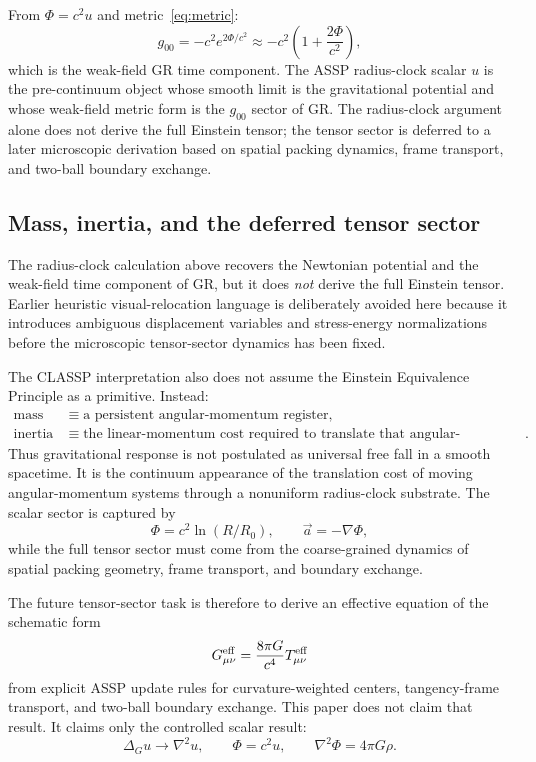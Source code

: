 \documentclass[11pt,a4paper]{article}
\begin{document}
From $\Phi=c^2u$ and metric~\eqref{eq:metric}:
\begin{equation}
  g_{00}=-c^2e^{2\Phi/c^2}
  \approx -c^2\!\left(1+\frac{2\Phi}{c^2}\right),
  \label{eq:g00_weak}
\end{equation}
which is the weak-field GR time component. The ASSP radius-clock scalar $u$
is the pre-continuum object whose smooth limit is the gravitational potential
and whose weak-field metric form is the $g_{00}$ sector of GR. The radius-clock
argument alone does not derive the full Einstein tensor; the tensor sector is
deferred to a later microscopic derivation based on spatial packing dynamics,
frame transport, and two-ball boundary exchange.


\subsection{Mass, inertia, and the deferred tensor sector}
\label{sec:no_eep_tensor_deferred}

The radius-clock calculation above recovers the Newtonian potential and the
weak-field time component of GR, but it does \emph{not} derive the full Einstein
tensor.  Earlier heuristic visual-relocation language is deliberately avoided
here because it introduces ambiguous displacement variables and stress-energy
normalizations before the microscopic tensor-sector dynamics has been fixed.

The CLASSP interpretation also does not assume the Einstein Equivalence
Principle as a primitive.  Instead:
\begin{align}
  \text{mass} &\equiv \text{a persistent angular-momentum register},
  \label{eq:mass_angular_register}\\
  \text{inertia} &\equiv \text{the linear-momentum cost required to translate
  that angular-momentum register}.
  \label{eq:inertia_linear_cost}
\end{align}
Thus gravitational response is not postulated as universal free fall in a
smooth spacetime.  It is the continuum appearance of the translation cost of
moving angular-momentum systems through a nonuniform radius-clock substrate.
The scalar sector is captured by
\begin{equation}
  \Phi=c^2\ln(R/R_0),\qquad \vec a=-\nabla\Phi,
\end{equation}
while the full tensor sector must come from the coarse-grained dynamics of
spatial packing geometry, frame transport, and boundary exchange.

The future tensor-sector task is therefore to derive an effective equation of
the schematic form
\begin{equation}
  G_{\mu\nu}^{\rm eff}
  =
  \frac{8\pi G}{c^4}T_{\mu\nu}^{\rm eff}
\end{equation}
from explicit ASSP update rules for curvature-weighted centers, tangency-frame
transport, and two-ball boundary exchange.  This paper does not claim that
result.  It claims only the controlled scalar result:
\begin{equation}
  \Delta_G u\to\nabla^2u,
  \qquad
  \Phi=c^2u,
  \qquad
  \nabla^2\Phi=4\pi G\rho.
\end{equation}
\end{document}
